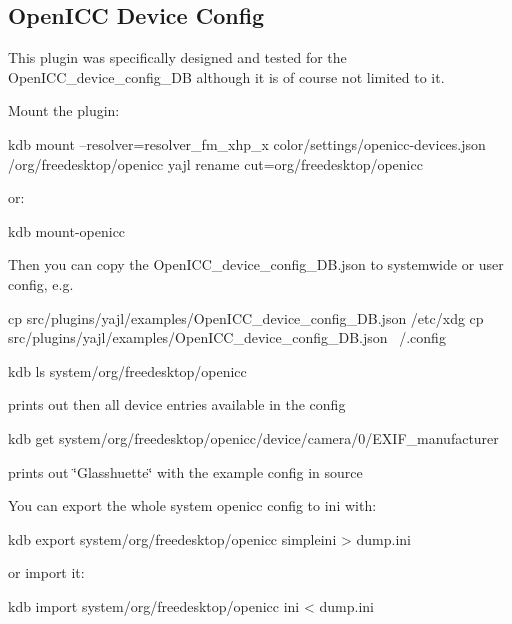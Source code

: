 \subsection*{Open\+I\+CC Device Config}

This plugin was specifically designed and tested for the {\ttfamily Open\+I\+C\+C\+\_\+device\+\_\+config\+\_\+\+DB} although it is of course not limited to it.

Mount the plugin\+: \begin{DoxyVerb}kdb mount --resolver=resolver_fm_xhp_x color/settings/openicc-devices.json /org/freedesktop/openicc yajl rename cut=org/freedesktop/openicc
\end{DoxyVerb}


or\+: \begin{DoxyVerb}kdb mount-openicc
\end{DoxyVerb}


Then you can copy the Open\+I\+C\+C\+\_\+device\+\_\+config\+\_\+\+D\+B.\+json to systemwide or user config, e.\+g. \begin{DoxyVerb}cp src/plugins/yajl/examples/OpenICC_device_config_DB.json /etc/xdg
cp src/plugins/yajl/examples/OpenICC_device_config_DB.json ~/.config

kdb ls system/org/freedesktop/openicc
\end{DoxyVerb}


prints out then all device entries available in the config \begin{DoxyVerb}kdb get system/org/freedesktop/openicc/device/camera/0/EXIF_manufacturer
\end{DoxyVerb}


prints out \char`\"{}\+Glasshuette\char`\"{} with the example config in source

You can export the whole system openicc config to ini with\+: \begin{DoxyVerb}kdb export system/org/freedesktop/openicc simpleini > dump.ini
\end{DoxyVerb}


or import it\+: \begin{DoxyVerb}kdb import system/org/freedesktop/openicc ini < dump.ini\end{DoxyVerb}
 